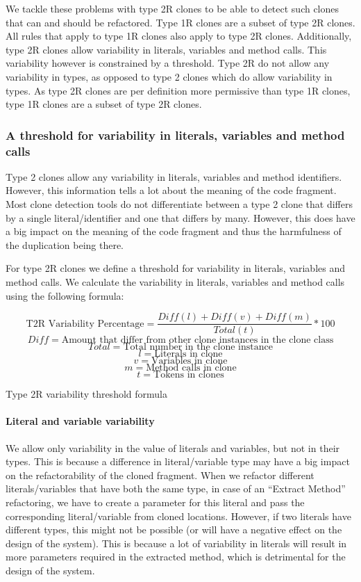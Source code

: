 We tackle these problems with type 2R clones to be able to detect such clones that can and should be refactored. Type 1R clones are a subset of type 2R clones. All rules that apply to type 1R clones also apply to type 2R clones. Additionally, type 2R clones allow variability in literals, variables and method calls. This variability however is constrained by a threshold. Type 2R do not allow any variability in types, as opposed to type 2 clones which do allow variability in types. As type 2R clones are per definition more permissive than type 1R clones, type 1R clones are a subset of type 2R clones.

\subsubsection{A threshold for variability in literals, variables and method calls}\label{sec:variabilitythreshold}
Type 2 clones allow any variability in literals, variables and method identifiers. However, this information tells a lot about the meaning of the code fragment. Most clone detection tools do not differentiate between a type 2 clone that differs by a single literal/identifier and one that differs by many. However, this does have a big impact on the meaning of the code fragment and thus the harmfulness of the duplication being there.

For type 2R clones we define a threshold for variability in literals, variables and method calls. We calculate the variability in literals, variables and method calls using the following formula:

\begin{eqfloat}\label{eq:type2r}
$$\text{T2R Variability Percentage}=\frac{Diff(l) + Diff(v) + Diff(m)}{Total(t)}*100$$
$$Diff = \text{Amount that differ from other clone instances in the clone class}$$
$$Total = \text{Total number in the clone instance}$$
$$l = \text{Literals in clone}$$
$$v = \text{Variables in clone}$$
$$m = \text{Method calls in clone}$$
$$t = \text{Tokens in clones}$$
\caption{Type 2R variability threshold formula}\end{eqfloat}

\paragraph{Literal and variable variability}\label{sec:t2rliteralandvariable}
We allow only variability in the value of literals and variables, but not in their types. This is because a difference in literal/variable type may have a big impact on the refactorability of the cloned fragment. When we refactor different literals/variables that have both the same type, in case of an ``Extract Method'' refactoring, we have to create a parameter for this literal and pass the corresponding literal/variable from cloned locations. However, if two literals have different types, this might not be possible (or will have a negative effect on the design of the system). This is because a lot of variability in literals will result in more parameters required in the extracted method, which is detrimental for the design of the system.

